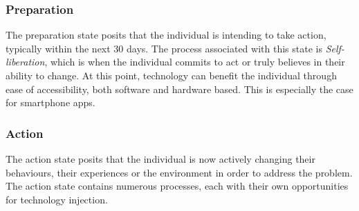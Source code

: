 \subsubsection{Preparation}
The preparation state posits that the individual is intending to take action, typically within the next 30 days. The process associated with this state is \textit{Self-liberation}, which is when the individual commits to act or truly believes in their ability to change. At this point, technology can benefit the individual through ease of accessibility, both software and hardware based. This is especially the case for smartphone apps.

\subsubsection{Action} \label{subsubsection: ttm-action-phase}
The action state posits that the individual is now actively changing their behaviours, their experiences or the environment in order to address the problem. The action state contains numerous processes, each with their own opportunities for technology injection.

